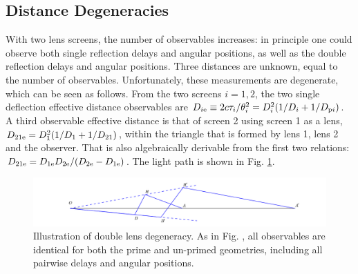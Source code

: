 \documentclass[useAMS,usenatbib]{mn2e}
\begin{document}
\subsection{Distance Degeneracies}
\label{sec:degeneracy}
With two lens screens, the number of observables increases: in
principle one could observe both single reflection delays and angular
positions, as well as the double reflection delays and angular
positions.  Three distances are unknown, equal to the number of
observables.  Unfortunately, these measurements are degenerate, which
can be seen as follows. From the two screens $i=1,2$, the two single
deflection effective distance observables are
$D_{i{\rm e}} \equiv 2c\tau_i/\theta_i^2=D_i^2(1/D_i+1/D_{{\rm p}i})$.  A third
observable effective distance is that of screen 2 using screen 1 as a
lens, $D_{21{\rm e}}=D_1^2(1/D_1+1/D_{21})$, within the triangle that is formed by lens 1, lens 2 and the observer. That is also algebraically
derivable from the first two relations:
$D_{{21}{\rm e}}=D_{1{\rm e}}D_{2{\rm e}}/(D_{2{\rm e}}-D_{1{\rm e}})$. The light path is shown in Fig. \ref{fig:double_degeneracy}.
\begin{figure}
\centering
\hspace*{-1in}\includegraphics[width=9in]{double_degeneracy.pdf}
\caption{Illustration of double lens degeneracy.  As in
  Fig. \protect{\ref{fig:Singledegeneracy}}, all observables are identical
  for both the prime and un-primed geometries, including all pairwise
  delays and angular positions.}
\label{fig:double_degeneracy}
\end{figure}
\end{document}

